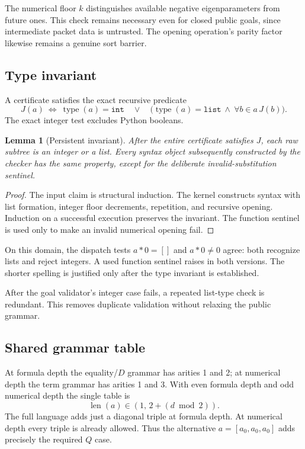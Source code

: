 \documentclass[11pt]{article}
\newtheorem{lemma}[theorem]{Lemma}
\theoremstyle{definition}\newtheorem{definition}[theorem]{Definition}
\theoremstyle{remark}\newtheorem{remark}[theorem]{Remark}
\begin{document}
The numerical floor $k$ distinguishes available negative
eigenparameters from future ones. This check remains necessary
even for closed public goals, since intermediate packet data is
untrusted. The opening operation's parity factor likewise remains
a genuine sort barrier.

\subsection{Type invariant}

A certificate satisfies the exact recursive predicate
\[
 J(a)\ \Longleftrightarrow\
 \operatorname{type}(a)=\texttt{int}\quad\vee\quad
 \bigl(\operatorname{type}(a)=\texttt{list}
            \ \wedge\ \forall b\in a\,J(b)\bigr).
\]
The exact integer test excludes Python booleans.

\begin{lemma}[Persistent invariant]\label{main:types}
After the entire certificate satisfies $J$, each raw subtree is
an integer or a list. Every syntax object subsequently constructed
by the checker has the same property, except for the deliberate
invalid-substitution sentinel.
\end{lemma}
\begin{proof}
The input claim is structural induction. The kernel constructs
syntax with list formation, integer floor decrements, repetition,
and recursive opening. Induction on a successful execution preserves
the invariant. The function sentinel is used only to make an
invalid numerical opening fail.
\end{proof}

On this domain, the dispatch tests $a*0=[]$ and $a*0\ne0$ agree:
both recognize lists and reject integers. A used function sentinel
raises in both versions. The shorter spelling is justified only
after the type invariant is established.

After the goal validator's integer case fails, a repeated list-type
check is redundant. This removes duplicate validation without
relaxing the public grammar.

\subsection{Shared grammar table}

At formula depth the equality/$D$ grammar has arities 1 and 2;
at numerical depth the term grammar has arities 1 and 3.
With even formula depth and odd numerical depth the single table is
\[
                    \operatorname{len}(a)
                    \in(1,\,2+(d\bmod2)).
\tag{Arity table}
\]
The full language adds just a diagonal triple at formula depth.
At numerical depth every triple is already allowed. Thus the
alternative $a=[a_0,a_0,a_0]$ adds precisely the required $Q$ case.
\end{document}
